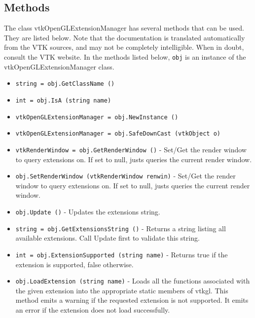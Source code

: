 \subsection{Methods}

The class vtkOpenGLExtensionManager has several methods that can be used.
  They are listed below.
Note that the documentation is translated automatically from the VTK sources,
and may not be completely intelligible.  When in doubt, consult the VTK website.
In the methods listed below, \verb|obj| is an instance of the vtkOpenGLExtensionManager class.
\begin{itemize}
\item  \verb|string = obj.GetClassName ()|

\item  \verb|int = obj.IsA (string name)|

\item  \verb|vtkOpenGLExtensionManager = obj.NewInstance ()|

\item  \verb|vtkOpenGLExtensionManager = obj.SafeDownCast (vtkObject o)|

\item  \verb|vtkRenderWindow = obj.GetRenderWindow ()| -  Set/Get the render window to query extensions on.  If set to null,
 justs queries the current render window.

\item  \verb|obj.SetRenderWindow (vtkRenderWindow renwin)| -  Set/Get the render window to query extensions on.  If set to null,
 justs queries the current render window.

\item  \verb|obj.Update ()| -  Updates the extensions string.

\item  \verb|string = obj.GetExtensionsString ()| -  Returns a string listing all available extensions.  Call Update first
 to validate this string.

\item  \verb|int = obj.ExtensionSupported (string name)| -  Returns true if the extension is supported, false otherwise.

\item  \verb|obj.LoadExtension (string name)| -  Loads all the functions associated with the given extension into the
 appropriate static members of vtkgl. This method emits a warning if the
 requested extension is not supported. It emits an error if the extension
 does not load successfully.


\end{itemize}
